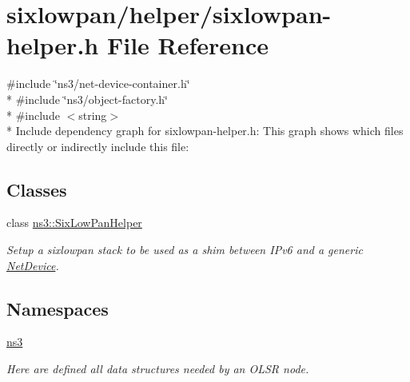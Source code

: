 \hypertarget{sixlowpan-helper_8h}{}\section{sixlowpan/helper/sixlowpan-\/helper.h File Reference}
\label{sixlowpan-helper_8h}
{\ttfamily \#include \char`\"{}ns3/net-\/device-\/container.\+h\char`\"{}}\\*
{\ttfamily \#include \char`\"{}ns3/object-\/factory.\+h\char`\"{}}\\*
{\ttfamily \#include $<$string$>$}\\*
Include dependency graph for sixlowpan-\/helper.h\+:
This graph shows which files directly or indirectly include this file\+:
\subsection*{Classes}
\begin{DoxyCompactItemize}
\item 
class \hyperlink{classns3_1_1SixLowPanHelper}{ns3\+::\+Six\+Low\+Pan\+Helper}
\begin{DoxyCompactList}\small\item\em Setup a sixlowpan stack to be used as a shim between I\+Pv6 and a generic \hyperlink{classns3_1_1NetDevice}{Net\+Device}. \end{DoxyCompactList}\end{DoxyCompactItemize}
\subsection*{Namespaces}
\begin{DoxyCompactItemize}
\item 
 \hyperlink{namespacens3}{ns3}
\begin{DoxyCompactList}\small\item\em Here are defined all data structures needed by an O\+L\+SR node. \end{DoxyCompactList}\end{DoxyCompactItemize}
